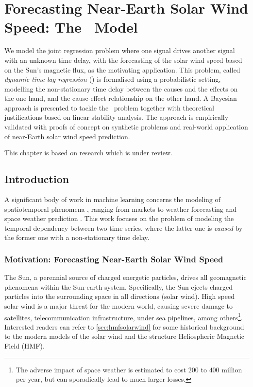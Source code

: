 \chapter{Forecasting Near-Earth Solar Wind Speed: The \XX \ Model}\label{chapter:pdt}

{\small
  We model the joint regression problem where one signal drives another signal with an unknown 
  time delay, with the forecasting of the solar wind speed based on the Sun's magnetic flux, as the 
  motivating application. This problem, called \emph{dynamic time lag regression} (\XX) is 
  formalised using a probabilistic setting, modelling the non-stationary time delay between the 
  causes and the effects on the one hand, and the cause-effect relationship on the other hand. A 
  Bayesian approach is presented to tackle the \XX\ problem together with theoretical 
  justifications based on linear stability analysis. The approach is empirically validated with 
  proofs of concept on synthetic problems and real-world application of near-Earth solar wind speed 
  prediction. 
}


\vfill
{}
\vfill

\noindent
    \parbox{\textwidth}{%
        {\small This chapter is based on research which is under review.}
    }%


\clearpage


\section{Introduction}\label{sec:intro}
A significant body of work in machine learning concerns the modeling of spatiotemporal phenomena 
\citep{SurveyST,NIPSForecasting18}, ranging from markets \citep{Pedreschi} to weather forecasting 
\citep{Horvitz} and space weather prediction \citep{EnricoLorentz,camporeale2018machine,EnricoArxiv}. 
This work focuses on the problem of modeling the temporal dependency between two time series, where 
the latter one is {\em caused} by the former one \citep{Granger} with a non-stationary time delay. 


\subsection{Motivation: Forecasting Near-Earth Solar Wind Speed}\label{sec:motivationsolarwind}
The Sun, a perennial source of charged energetic particles, drives all geomagnetic phenomena within 
the Sun-earth system. Specifically, the Sun ejects charged particles into the surrounding space in 
all directions (solar wind). High speed solar wind is a major threat for the modern world, causing 
severe damage to satellites, telecommunication infrastructure, under sea pipelines, among 
others\footnote{The adverse impact of space weather is estimated to cost $200$ to $400$ 
million per year, but can sporadically lead to much larger losses.}. Interested readers can refer 
to \cref{sec:hmfsolarwind} for some historical background to the modern models of the solar wind 
and the structure Heliospheric Magnetic Field (HMF). 

